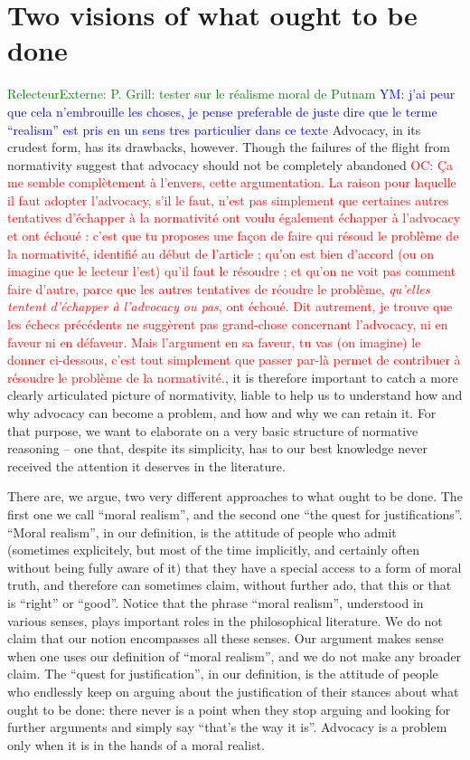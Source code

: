 \documentclass[preprint, french, english, 11pt]{elsarticle}%
\newcommand{\commentYM}[1]{\textcolor{blue}{YM: #1}}
\newcommand{\commentOC}[1]{\textcolor{red}{OC: #1}}
\newcommand{\commentE}[1]{\textcolor{green}{RelecteurExterne: #1}}
\begin{document}
\section{Two visions of what ought to be done}
\commentE{P. Grill: tester sur le réalisme moral de Putnam}
\commentYM{j'ai peur que cela n'embrouille les choses, je pense preferable de juste dire que le terme ``realism'' est pris en un sens tres particulier dans ce texte}
\noindent Advocacy, in its crudest form, has its drawbacks, however. Though the failures of the flight from normativity suggest that advocacy should not be completely abandoned
\commentOC{Ça me semble complètement à l’envers, cette argumentation. La raison pour laquelle il faut adopter l’advocacy, s’il le faut, n’est pas simplement que certaines autres tentatives d’échapper à la normativité ont voulu également échapper à l’advocacy et ont échoué : c’est que tu proposes une façon de faire qui résoud le problème de la normativité, identifié au début de l’article ; qu’on est bien d’accord (ou on imagine que le lecteur l’est) qu’il faut le résoudre ; et qu’on ne voit pas comment faire d’autre, parce que les autres tentatives de réoudre le problème, \emph{qu’elles tentent d’échapper à l’advocacy ou pas}, ont échoué. Dit autrement, je trouve que les échecs précédents ne suggèrent pas grand-chose concernant l’advocacy, ni en faveur ni en défaveur. Mais l’argument en sa faveur, tu vas (on imagine) le donner ci-dessous, c’est tout simplement que passer par-là permet de contribuer à résoudre le problème de la normativité.}, it is therefore important to catch a more clearly articulated picture of normativity, liable to help us to understand how and why advocacy can become a problem, and how and why we can retain it. For that purpose, we want to elaborate on a very basic structure of normative reasoning -- one that, despite its simplicity, has to our best knowledge never received the attention it deserves in the literature.

There are, we argue, two very different approaches to what ought to be done. The first one we call ``moral realism'', and the second one ``the quest for justifications''.
``Moral realism'', in our definition, is the attitude of people who admit (sometimes explicitely, but most of the time implicitly, and certainly often without being fully aware of it) that they have a special access to a form of moral truth, and therefore can sometimes claim, without further ado, that this or that is ``right'' or ``good''. Notice that the phrase ``moral realism'', understood in various senses, plays important roles in the philosophical literature. We do not claim that our notion encompasses all these senses. Our argument makes sense when one uses our definition of ``moral realism'', and we do not make any broader claim. The ``quest for justification'', in our definition, is the attitude of people who endlessly keep on arguing about the justification of their stances about what ought to be done: there never is a point when they stop arguing and looking for further arguments and simply say ``that's the way it is''. Advocacy is a problem only when it is in the hands of a moral realist.
\end{document}
